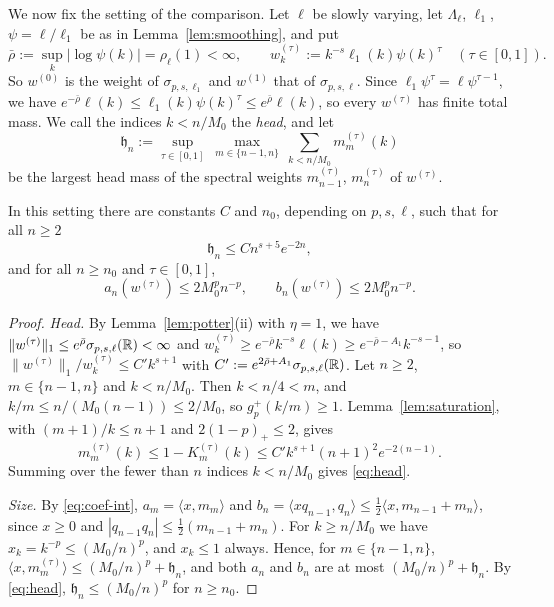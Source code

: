 We now fix the setting of the comparison. Let $\ell$ be slowly varying, let $\Lambda_\ell$, $\ell_1$, $\psi=\ell/\ell_1$
be as in Lemma~\ref{lem:smoothing}, and put
\[
  \bar\rho:=\sup_k|\log\psi(k)|=\rho_\ell(1)<\infty,\qquad
  w^{(\tau)}_k:=k^{-s}\ell_1(k)\psi(k)^\tau\quad(\tau\in[0,1]).
\]
So $w^{(0)}$ is the weight of $\sigma_{p,s,\ell_1}$ and $w^{(1)}$ that of $\sigma_{p,s,\ell}$. Since
$\ell_1\psi^\tau=\ell\psi^{\tau-1}$, we have $e^{-\bar\rho}\ell(k)\le\ell_1(k)\psi(k)^\tau\le e^{\bar\rho}\ell(k)$, so every
$w^{(\tau)}$ has finite total mass. We call the indices $k<n/M_0$ the \emph{head}, and let
\[
  \mathfrak h_n:=\sup_{\tau\in[0,1]}\ \max_{m\in\{n-1,n\}}\ \sum_{k<n/M_0}m^{(\tau)}_m(k)
\]
be the largest head mass of the spectral weights $m^{(\tau)}_{n-1}$, $m^{(\tau)}_n$ of $w^{(\tau)}$.

\begin{lemma}\label{lem:apriori}
In this setting there are constants $C$ and $n_0$, depending on $p,s,\ell$, such that for all $n\ge2$
\begin{equation}\label{eq:head}
  \mathfrak h_n\le Cn^{s+5}e^{-2n},
\end{equation}
and for all $n\ge n_0$ and $\tau\in[0,1]$,
\[
  a_n(w^{(\tau)})\le2M_0^pn^{-p},\qquad b_n(w^{(\tau)})\le2M_0^pn^{-p}.
\]
\end{lemma}

\begin{proof}
\emph{Head.} By Lemma~\ref{lem:potter}(ii) with $\eta=1$, we have
$\|w^{(\tau)}\|_1\le e^{\bar\rho}\sigma_{p,s,\ell}(\mathbb{R})<\infty$ and
$w^{(\tau)}_k\ge e^{-\bar\rho}k^{-s}\ell(k)\ge e^{-\bar\rho-A_1}k^{-s-1}$, so $\|w^{(\tau)}\|_1/w^{(\tau)}_k\le C'k^{s+1}$ with
$C':=e^{2\bar\rho+A_1}\sigma_{p,s,\ell}(\mathbb{R})$. Let $n\ge2$, $m\in\{n-1,n\}$ and $k<n/M_0$. Then $k<n/4<m$, and $k/m\le
n/(M_0(n-1))\le2/M_0$, so $g_p^+(k/m)\ge1$. Lemma~\ref{lem:saturation}, with $(m+1)/k\le n+1$ and $2(1-p)_+\le2$, gives
\[
  m^{(\tau)}_m(k)\le1-K^{(\tau)}_m(k)\le C'k^{s+1}(n+1)^2e^{-2(n-1)} .
\]
Summing over the fewer than $n$ indices $k<n/M_0$ gives \eqref{eq:head}.

\emph{Size.} By \eqref{eq:coef-int}, $a_m=\langle x,m_m\rangle$ and $b_n=\langle xq_{n-1},q_n\rangle\le\frac12\langle
x,m_{n-1}+m_n\rangle$, since $x\ge0$ and $|q_{n-1}q_n|\le\frac12(m_{n-1}+m_n)$. For $k\ge n/M_0$ we have
$x_k=k^{-p}\le(M_0/n)^p$, and $x_k\le1$ always. Hence, for $m\in\{n-1,n\}$,
$\langle x,m^{(\tau)}_m\rangle\le(M_0/n)^p+\mathfrak h_n$, and both $a_n$ and $b_n$ are at most $(M_0/n)^p+\mathfrak h_n$. By
\eqref{eq:head}, $\mathfrak h_n\le(M_0/n)^p$ for $n\ge n_0$.
\end{proof}

